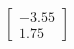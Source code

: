 \documentclass[preview]{standalone}
\begin{document}
\begin{align*}
\begin{bmatrix} -3.55 \\ 1.75 \end{bmatrix}
\end{align*}
\end{document}
